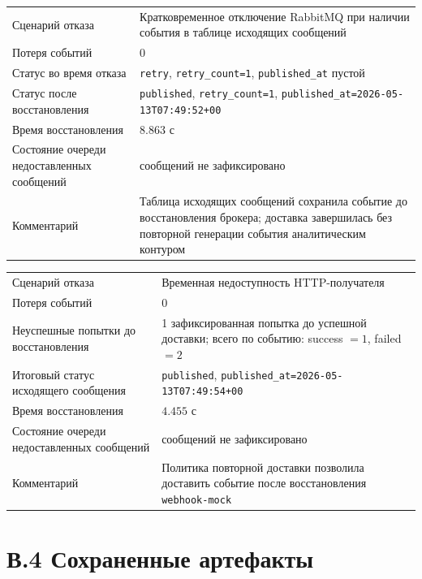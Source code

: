 \begin{longtable}{@{}p{}p{}@{}}
Сценарий отказа & Кратковременное отключение RabbitMQ при наличии события в таблице исходящих сообщений \\
Потеря событий & 0 \\
Статус во время отказа & \texttt{retry}, \texttt{retry\_count=1}, \texttt{published\_at} пустой \\
Статус после восстановления & \texttt{published}, \texttt{retry\_count=1}, \texttt{published\_at=2026-05-13T07:49:52+00} \\
Время восстановления & \(8.863\) с \\
Состояние очереди недоставленных сообщений & сообщений не зафиксировано \\
Комментарий & Таблица исходящих сообщений сохранила событие до восстановления брокера; доставка завершилась без повторной генерации события аналитическим контуром \\
\end{longtable}

\begin{longtable}{@{}p{}p{}@{}}
Сценарий отказа & Временная недоступность HTTP-получателя \\
Потеря событий & 0 \\
Неуспешные попытки до восстановления & 1 зафиксированная попытка до успешной доставки; всего по событию: success \(=1\), failed \(=2\) \\
Итоговый статус исходящего сообщения & \texttt{published}, \texttt{published\_at=2026-05-13T07:49:54+00} \\
Время восстановления & \(4.455\) с \\
Состояние очереди недоставленных сообщений & сообщений не зафиксировано \\
Комментарий & Политика повторной доставки позволила доставить событие после восстановления \texttt{webhook-mock} \\
\end{longtable}

\section*{В.4 Сохраненные артефакты}
{}

